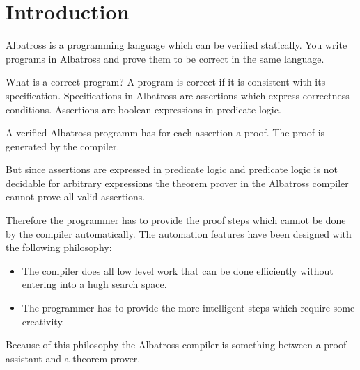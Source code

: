 \chapter{Introduction}


Albatross is a programming language which can be verified statically. You
write programs in Albatross and prove them to be correct in the same language.

What is a correct program? A program is correct if it is consistent with its
specification. Specifications in Albatross are assertions which express
correctness conditions. Assertions are boolean expressions in predicate logic.


A verified Albatross programm has for each assertion a proof. The proof is
generated by the compiler.

But since assertions are expressed in predicate logic and predicate logic is
not decidable for arbitrary expressions the theorem prover in the Albatross
compiler cannot prove all valid assertions.

Therefore the programmer has to provide the proof steps which cannot be done
by the compiler automatically. The automation features have been designed with
the following philosophy:

\begin{itemize}
\item The compiler does all low level work that can be done efficiently
  without entering into a hugh search space.

\item The programmer has to provide the more intelligent steps which require
  some creativity.

\end{itemize}

Because of this philosophy the Albatross compiler is something between a proof
assistant and a theorem prover.







